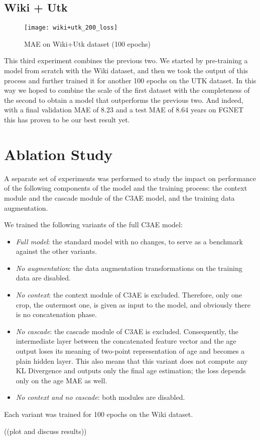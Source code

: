 \subsection{Wiki + Utk}
\label{sec:wikiutk}

\begin{wrapfigure}[17]{r}{0.5\textwidth}
  \centering
  \texttt{[image: wiki+utk\_200\_loss]}
  \caption{MAE on Wiki+Utk dataset (100 epochs)}
  \label{fig:wiki+utk_loss}
\end{wrapfigure}

This third experiment combines the previous two. We started by pre-training a model from 
scratch with the Wiki dataset, and then we took the output of this process and further 
trained it for another 100 epochs on the UTK dataset. In this way we hoped to combine the
scale of the first dataset with the completeness of the second to obtain a model that
outperforms the previous two. And indeed, with a final validation MAE of 8.23 and a test
MAE of 8.64 years on FGNET this has proven to be our best result yet.

\section{Ablation Study}
\label{sec:ablation_study}
A separate set of experiments was performed to study the impact on performance
of the following components of the model and the training process:
the context module and the cascade module of the C3AE model,
and the training data augmentation.

We trained the following variants of the full C3AE model:

\begin{itemize}
  \item \textit{Full model}: the standard model with no changes,
    to serve as a benchmark against the other variants.
  \item \textit{No augmentation}: the data augmentation transformations
    on the training data are disabled.
  \item \textit{No context}: the context module of C3AE is excluded.
    Therefore, only one crop, the outermost one, is given as input to
    the model, and obviously there is no concatenation phase.
  \item \textit{No cascade}: the cascade module of C3AE is excluded.
    Consequently, the intermediate layer between the concatenated feature vector
    and the age output loses its meaning of two-point representation of age
    and becomes a plain hidden layer. This also means that this variant
    does not compute any KL Divergence and outputs only the final age estimation;
    the loss depends only on the age MAE as well.
  \item \textit{No context and no cascade}: both modules are disabled.
\end{itemize}

Each variant was trained for 100 epochs on the Wiki dataset.

((plot and discuss results))
